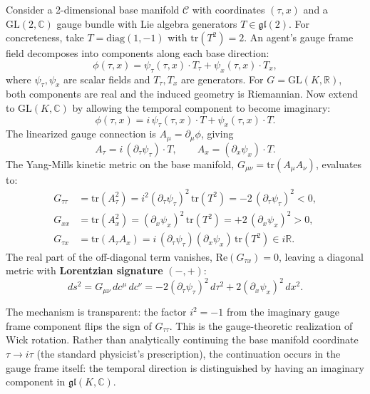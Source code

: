 \documentclass[11pt]{article}
\begin{document}
Consider a 2-dimensional base manifold $\mathcal{C}$ with coordinates $(\tau, x)$ and a $\mathrm{GL}(2, \mathbb{C})$ gauge bundle with Lie algebra generators $T \in \mathfrak{gl}(2)$. For concreteness, take $T = \mathrm{diag}(1, -1)$ with $\mathrm{tr}(T^2) = 2$. An agent's gauge frame field decomposes into components along each base direction:
\begin{equation}
\phi(\tau, x) = \psi_\tau(\tau, x) \cdot T_\tau + \psi_x(\tau, x) \cdot T_x,
\end{equation}
where $\psi_\tau, \psi_x$ are scalar fields and $T_\tau, T_x$ are generators. For $G = \mathrm{GL}(K, \mathbb{R})$, both components are real and the induced geometry is Riemannian. Now extend to $\mathrm{GL}(K, \mathbb{C})$ by allowing the temporal component to become imaginary:
\begin{equation}
\phi(\tau, x) = i\,\psi_\tau(\tau, x) \cdot T + \psi_x(\tau, x) \cdot T.
\label{eq:complex_gauge_frame}
\end{equation}
The linearized gauge connection is $A_\mu = \partial_\mu \phi$, giving
\begin{equation}
A_\tau = i\,(\partial_\tau \psi_\tau) \cdot T, \qquad A_x = (\partial_x \psi_x) \cdot T.
\end{equation}
The Yang-Mills kinetic metric on the base manifold, $G_{\mu\nu} = \mathrm{tr}(A_\mu A_\nu)$, evaluates to:
\begin{align}
G_{\tau\tau} &= \mathrm{tr}(A_\tau^2) = i^2 (\partial_\tau \psi_\tau)^2 \,\mathrm{tr}(T^2) = -2\,(\partial_\tau \psi_\tau)^2 < 0, \label{eq:G_tautau} \\
G_{xx} &= \mathrm{tr}(A_x^2) = (\partial_x \psi_x)^2 \,\mathrm{tr}(T^2) = +2\,(\partial_x \psi_x)^2 > 0, \label{eq:G_xx_ym} \\
G_{\tau x} &= \mathrm{tr}(A_\tau A_x) = i\,(\partial_\tau \psi_\tau)(\partial_x \psi_x)\,\mathrm{tr}(T^2) \in i\mathbb{R}. \label{eq:G_taux}
\end{align}
The real part of the off-diagonal term vanishes, $\mathrm{Re}(G_{\tau x}) = 0$, leaving a diagonal metric with \textbf{Lorentzian signature} $(-,+)$:
\begin{equation}
\boxed{ds^2 = G_{\mu\nu}\,dc^\mu\,dc^\nu = -2(\partial_\tau \psi_\tau)^2\,d\tau^2 + 2(\partial_x \psi_x)^2\,dx^2.}
\label{eq:lorentzian_metric}
\end{equation}

The mechanism is transparent: the factor $i^2 = -1$ from the imaginary gauge frame component flips the sign of $G_{\tau\tau}$. This is the gauge-theoretic realization of Wick rotation. Rather than analytically continuing the base manifold coordinate $\tau \to i\tau$ (the standard physicist's prescription), the continuation occurs in the gauge frame itself: the temporal direction is distinguished by having an imaginary component in $\mathfrak{gl}(K, \mathbb{C})$.
\end{document}
